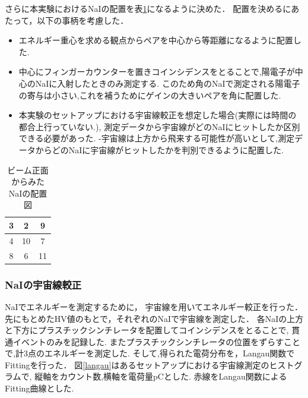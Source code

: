さらに本実験におけるNaIの配置を表\ref{haichi}になるように決めた．
配置を決めるにあたって，以下の事柄を考慮した．
\begin{itemize}
\item エネルギー重心を求める観点からペアを中心から等距離になるように配置した.
\item 中心にフィンガーカウンターを置きコインシデンスをとることで,陽電子が中心のNaIに入射したときのみ測定する.
  このため角のNaIで測定される陽電子の寄与は小さい,これを補うためにゲインの大きいペアを角に配置した.%
\item 本実験のセットアップにおける宇宙線較正を想定した場合(実際には時間の都合上行っていない.),
  測定データから宇宙線がどのNaIにヒットしたか区別できる必要があった.
  -宇宙線は上方から飛来する可能性が高いとして,測定データからどのNaIに宇宙線がヒットしたかを判別できるように配置した.
\end{itemize}
\begin{table}[H]
  \begin{center}
    \caption{ビーム正面からみたNaIの配置図}\label{haichi}
    \begin{tabular}{|c|c|c|}\hline 
      \cellcolor{yellow}3&\cellcolor{red}2&\cellcolor{yellow}9\\ \hline
      \cellcolor{cyan}4&10&\cellcolor{red}7\\ \hline
      \cellcolor{green}8&\cellcolor{cyan}6&\cellcolor{green}11\\ \hline
    \end{tabular}
  \end{center}
\end{table}
\newpage
\subsubsection{NaIの宇宙線較正}
NaIでエネルギーを測定するために， 宇宙線を用いてエネルギー較正を行った．
先にもとめたHV値のもとで，それぞれのNaIで宇宙線を測定した．%
各NaIの上方と下方にプラスチックシンチレータを配置してコインシデンスをとることで,
貫通イベントのみを記録した.
またプラスチックシンチレータの位置をずらすことで,計3点のエネルギーを測定した.
そして,得られた電荷分布を，Langau関数でFittingを行った．
図\ref{langau}はあるセットアップにおける宇宙線測定のヒストグラムで,
縦軸をカウント数,横軸を電荷量$\mathrm{pC}$とした.
赤線をLangau関数によるFitting曲線とした.

